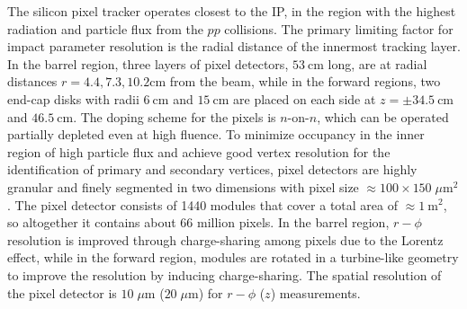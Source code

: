 The silicon pixel tracker operates closest to the IP, in the region with the highest radiation and particle flux from the $pp$ collisions.
The primary limiting factor for impact parameter resolution is the radial distance of the innermost tracking layer.
In the barrel region, three layers of pixel detectors, $\SI{53}{\cm}$ long, are at radial distances $r = 4.4, 7.3, 10.2 \si{\cm}$ from the beam, while in the forward regions, two end-cap disks with radii $\SI{6}{\cm}$ and $\SI{15}{\cm}$ are placed on each side at $z = \pm \SI{34.5}{\cm}$ and $\SI{46.5}{\cm}$.
The doping scheme for the pixels is $n$-on-$n$, which can be operated partially depleted even at high fluence.
To minimize occupancy in the inner region of high particle flux and achieve good vertex resolution for the identification of primary and secondary vertices, pixel detectors are highly granular and finely segmented in two dimensions with pixel size $\approx 100 \times 150 \; \mu \si{\m \squared}$.
The pixel detector consists of 1440 modules that cover a total area of $\approx \SI{1}{\m \squared}$, so altogether it contains about 66 million pixels.
In the barrel region, $r-\phi$ resolution is improved through charge-sharing among pixels due to the Lorentz effect, while in the forward region, modules are rotated in a turbine-like geometry to improve the resolution by inducing charge-sharing.
The spatial resolution of the pixel detector is $10 \; \mu \si{\m}$ ($20 \; \mu \si{\m}$) for $r-\phi$ ($z$) measurements.

